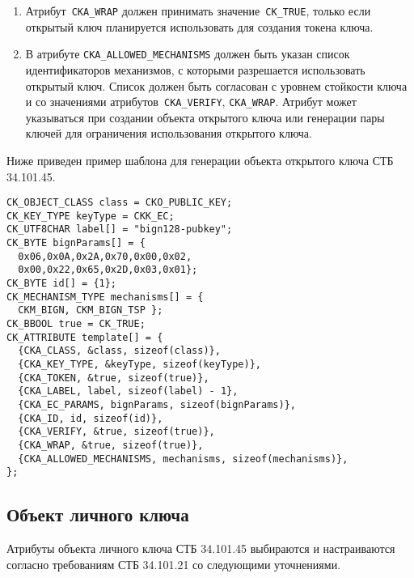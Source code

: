 \begin{enumerate}
\item
Атрибут~\verb|CKA_WRAP| должен принимать значение~\verb|CK_TRUE|,
только если открытый ключ планируется использовать для создания
токена ключа.

\item
В атрибуте \verb|CKA_ALLOWED_MECHANISMS| должен быть указан список 
идентификаторов механизмов, с которыми разрешается использовать открытый 
ключ. Список должен быть согласован с уровнем стойкости ключа и со 
значениями атрибутов~\verb|CKA_VERIFY|, \verb|CKA_WRAP|. 
%
Атрибут может указываться при создании объекта открытого ключа или 
генерации пары ключей для ограничения использования открытого ключа.
\end{enumerate}
 
Ниже приведен пример шаблона для генерации объекта открытого ключа СТБ 
34.101.45.

\begin{verbatim}
CK_OBJECT_CLASS class = CKO_PUBLIC_KEY;
CK_KEY_TYPE keyType = CKK_EC;
CK_UTF8CHAR label[] = "bign128-pubkey";
CK_BYTE bignParams[] = {
  0x06,0x0A,0x2A,0x70,0x00,0x02,
  0x00,0x22,0x65,0x2D,0x03,0x01};
CK_BYTE id[] = {1};
CK_MECHANISM_TYPE mechanisms[] = {
  CKM_BIGN, CKM_BIGN_TSP };
CK_BBOOL true = CK_TRUE;
CK_ATTRIBUTE template[] = {
  {CKA_CLASS, &class, sizeof(class)},
  {CKA_KEY_TYPE, &keyType, sizeof(keyType)},
  {CKA_TOKEN, &true, sizeof(true)},
  {CKA_LABEL, label, sizeof(label) - 1},
  {CKA_EC_PARAMS, bignParams, sizeof(bignParams)},
  {CKA_ID, id, sizeof(id)},
  {CKA_VERIFY, &true, sizeof(true)},
  {CKA_WRAP, &true, sizeof(true)},
  {CKA_ALLOWED_MECHANISMS, mechanisms, sizeof(mechanisms)},
};
\end{verbatim}

\subsection{Объект личного ключа}\label{CRYPTOKI.Privkey}


Атрибуты объекта личного ключа СТБ 34.101.45 
выбираются и настраиваются согласно требованиям СТБ 34.101.21 со 
следующими уточнениями.

